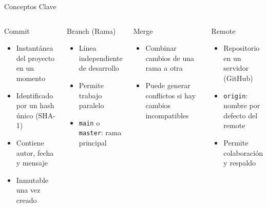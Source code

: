 \documentclass[aspectratio=169]{beamer}
\begin{document}
\begin{frame}{Conceptos Clave}
    \begin{columns}[t]
        \begin{block}{Commit}
            \begin{itemize}
                \item Instantánea del proyecto en un momento
                \item Identificado por un hash único (SHA-1)
                \item Contiene autor, fecha y mensaje
                \item Inmutable una vez creado
            \end{itemize}
        \end{block}
        
        \begin{block}{Branch (Rama)}
            \begin{itemize}
                \item Línea independiente de desarrollo
                \item Permite trabajo paralelo
                \item \texttt{main} o \texttt{master}: rama principal
            \end{itemize}
        \end{block}
        
        \begin{block}{Merge}
            \begin{itemize}
                \item Combinar cambios de una rama a otra
                \item Puede generar conflictos si hay cambios incompatibles
            \end{itemize}
        \end{block}
        
        \begin{block}{Remote}
            \begin{itemize}
                \item Repositorio en un servidor (GitHub)
                \item \texttt{origin}: nombre por defecto del remote
                \item Permite colaboración y respaldo
            \end{itemize}
        \end{block}
    \end{columns}
\end{frame}
\end{document}
